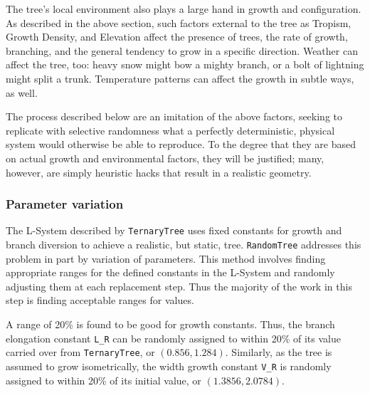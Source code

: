 \documentclass{article}
\newcommand{\tab}{\hspace*{2em}}
\begin{document}
    \tab The tree's local environment also plays a large hand in growth and configuration. As
described in the above section, such factors external to the tree as Tropism, Growth Density, and
Elevation affect the presence of trees, the rate of growth, branching, and the general tendency
to grow in a specific direction. Weather can affect the tree, too: heavy snow might bow a mighty
branch, or a bolt of lightning might split a trunk. Temperature patterns can affect the growth in
subtle ways, as well.

    \tab The process described below are an imitation of the above factors, seeking to replicate
with selective randomness what a perfectly deterministic, physical system would otherwise be able
to reproduce. To the degree that they are based on actual growth and environmental factors, they
will be justified; many, however, are simply heuristic hacks that result in a realistic geometry.


            \subsubsection{Parameter variation}
    \tab The L-System described by \verb|TernaryTree| uses fixed constants for growth and branch
diversion to achieve a realistic, but static, tree. \verb|RandomTree| addresses this problem in
part by variation of parameters\cite{abp96}. This method involves finding appropriate ranges for
the defined constants in the L-System and randomly adjusting them at each replacement step. Thus
the majority of the work in this step is finding acceptable ranges for values.

    \tab A range of 20\% is found to be good for growth constants. Thus, the branch elongation
constant \verb|L_R| can be randomly assigned to within 20\% of its value carried over from
\verb|TernaryTree|, or $(0.856, 1.284)$. Similarly, as the tree is assumed to grow isometrically,
the width growth constant \verb|V_R| is randomly assigned to within 20\% of its initial value, or
$(1.3856, 2.0784)$.


    
\end{document}
